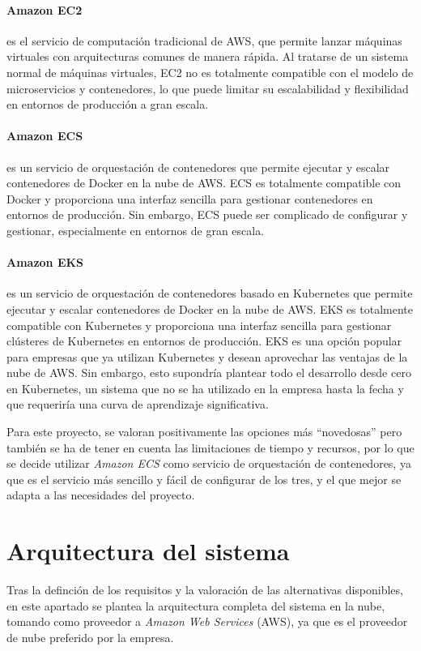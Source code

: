 \paragraph{Amazon EC2} es el servicio de computación tradicional de AWS, que
permite lanzar máquinas virtuales con arquitecturas comunes de manera rápida.
Al tratarse de un sistema normal de máquinas virtuales, EC2 no es totalmente
compatible con el modelo de microservicios y contenedores, lo que puede limitar
su escalabilidad y flexibilidad en entornos de producción a gran escala.

\paragraph{Amazon ECS} es un servicio de orquestación de contenedores que
permite ejecutar y escalar contenedores de Docker en la nube de AWS. ECS es
totalmente compatible con Docker y proporciona una interfaz sencilla para
gestionar contenedores en entornos de producción. Sin embargo, ECS puede ser
complicado de configurar y gestionar, especialmente en entornos de gran escala.

\paragraph{Amazon EKS} es un servicio de orquestación de contenedores basado
en Kubernetes que permite ejecutar y escalar contenedores de Docker en la nube
de AWS. EKS es totalmente compatible con Kubernetes y proporciona una interfaz
sencilla para gestionar clústeres de Kubernetes en entornos de producción. EKS
es una opción popular para empresas que ya utilizan Kubernetes y desean
aprovechar las ventajas de la nube de AWS. Sin embargo, esto supondría plantear
todo el desarrollo desde cero en Kubernetes, un sistema que no se ha utilizado
en la empresa hasta la fecha y que requeriría una curva de aprendizaje
significativa.

Para este proyecto, se valoran positivamente las opciones más ``novedosas'' pero
también se ha de tener en cuenta las limitaciones de tiempo y recursos, por lo
que se decide utilizar \textit{Amazon ECS} como servicio de orquestación de
contenedores, ya que es el servicio más sencillo y fácil de configurar de los
tres, y el que mejor se adapta a las necesidades del proyecto.



\newpage{}
\section{Arquitectura del sistema}\label{sec:arquitectura}
Tras la definción de los requisitos y la valoración de las alternativas
disponibles, en este apartado se plantea la arquitectura completa del sistema
en la nube, tomando como proveedor a \textit{Amazon Web Services} (AWS), ya que
es el proveedor de nube preferido por la empresa.

